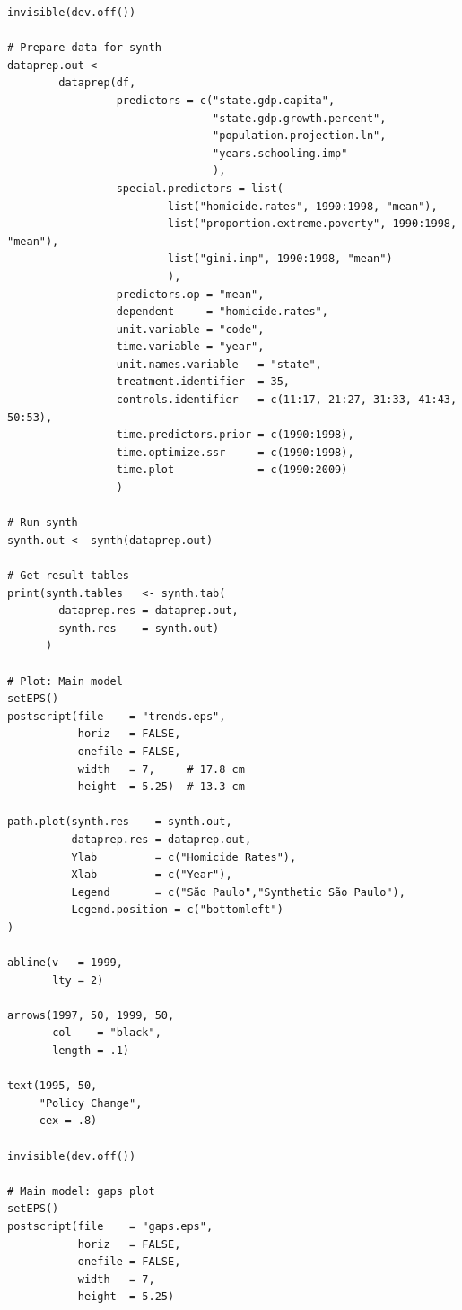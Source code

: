 \begin{verbatim}
invisible(dev.off())

# Prepare data for synth
dataprep.out <-
        dataprep(df,
                 predictors = c("state.gdp.capita",
                                "state.gdp.growth.percent",
                                "population.projection.ln",
                                "years.schooling.imp"
                                ),
                 special.predictors = list(
                         list("homicide.rates", 1990:1998, "mean"),
                         list("proportion.extreme.poverty", 1990:1998, "mean"),
                         list("gini.imp", 1990:1998, "mean")
                         ),
                 predictors.op = "mean",
                 dependent     = "homicide.rates",
                 unit.variable = "code",
                 time.variable = "year",
                 unit.names.variable   = "state",
                 treatment.identifier  = 35,
                 controls.identifier   = c(11:17, 21:27, 31:33, 41:43, 50:53),
                 time.predictors.prior = c(1990:1998),
                 time.optimize.ssr     = c(1990:1998),
                 time.plot             = c(1990:2009)
                 )

# Run synth
synth.out <- synth(dataprep.out)

# Get result tables
print(synth.tables   <- synth.tab(
        dataprep.res = dataprep.out,
        synth.res    = synth.out)
      )

# Plot: Main model
setEPS()
postscript(file    = "trends.eps",
           horiz   = FALSE,
           onefile = FALSE,
           width   = 7,     # 17.8 cm
           height  = 5.25)  # 13.3 cm

path.plot(synth.res    = synth.out,
          dataprep.res = dataprep.out,
          Ylab         = c("Homicide Rates"),
          Xlab         = c("Year"),
          Legend       = c("São Paulo","Synthetic São Paulo"),
          Legend.position = c("bottomleft")
)

abline(v   = 1999,
       lty = 2)

arrows(1997, 50, 1999, 50,
       col    = "black",
       length = .1)

text(1995, 50,
     "Policy Change",
     cex = .8)

invisible(dev.off())

# Main model: gaps plot
setEPS()
postscript(file    = "gaps.eps",
           horiz   = FALSE,
           onefile = FALSE,
           width   = 7,
           height  = 5.25)


\end{verbatim}

